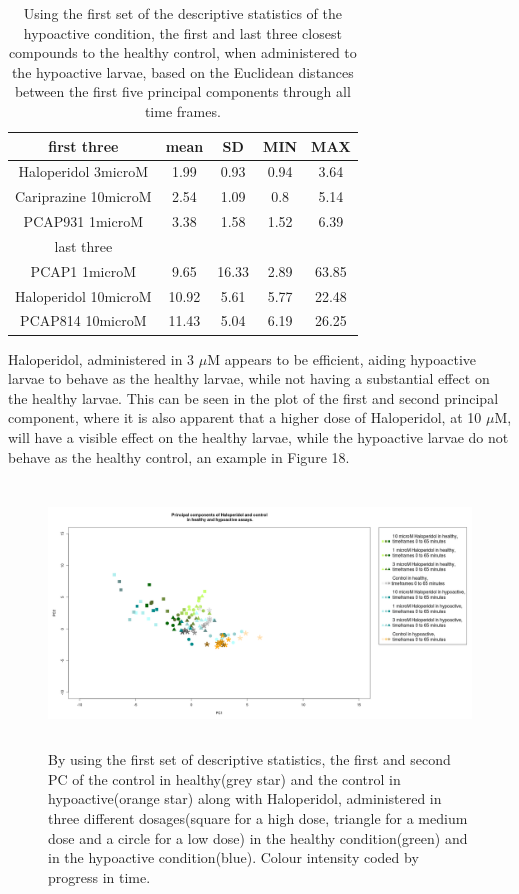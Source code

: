 \documentclass[a4paper,12pt]{article}
\begin{document}
\newpage
\begin{table}[h!]\tiny
\centering
\begin{tabular}{|c|c|c|c|c|}
\hline
first three           & mean & SD   & MIN  & MAX   \\ \hline
Haloperidol 3microM   & 1.99  & 0.93  & 0.94 & 3.64  \\ \hline
Cariprazine 10microM  & 2.54  & 1.09  & 0.8  & 5.14  \\ \hline
PCAP931 1microM       & 3.38  & 1.58  & 1.52 & 6.39  \\ \hline
last three            & \multicolumn{4}{c|}{}      \\ \hline
PCAP1 1microM         & 9.65  & 16.33 & 2.89 & 63.85 \\ \hline
Haloperidol 10microM  & 10.92 & 5.61  & 5.77 & 22.48 \\ \hline
PCAP814 10microM      & 11.43 & 5.04  & 6.19 & 26.25 \\ \hline
\end{tabular}
\caption{Using the first set of the descriptive statistics of the hypoactive condition, the first and last three closest compounds to the healthy control, when administered to the hypoactive larvae, based on the Euclidean distances between the first five principal components through all time frames.}
\end{table}
Haloperidol, administered in 3 $\mu$M appears to be efficient, aiding hypoactive larvae to behave as the healthy larvae, while not having a substantial effect on the healthy larvae. This can be seen in the plot of the first and second principal component, where it is also apparent that a higher dose of Haloperidol, at 10 $\mu$M, will have a visible effect on the healthy larvae, while the hypoactive larvae do not behave as the healthy control, an example in Figure 18.
\begin{figure}[h!]
\begin{center}
\includegraphics[width=14cm,height=7cm]{Haloperidol_Control_DarkApoLow.png}
\caption{By using the first set of descriptive statistics, the first and second PC of the control in healthy(grey star) and the control in hypoactive(orange star) along with Haloperidol, administered in three different dosages(square for a high dose, triangle for a medium dose and a circle for a low dose) in the healthy condition(green) and in the hypoactive condition(blue). Colour intensity coded by progress in time.}
\end{center}
\end{figure}
\end{document}
